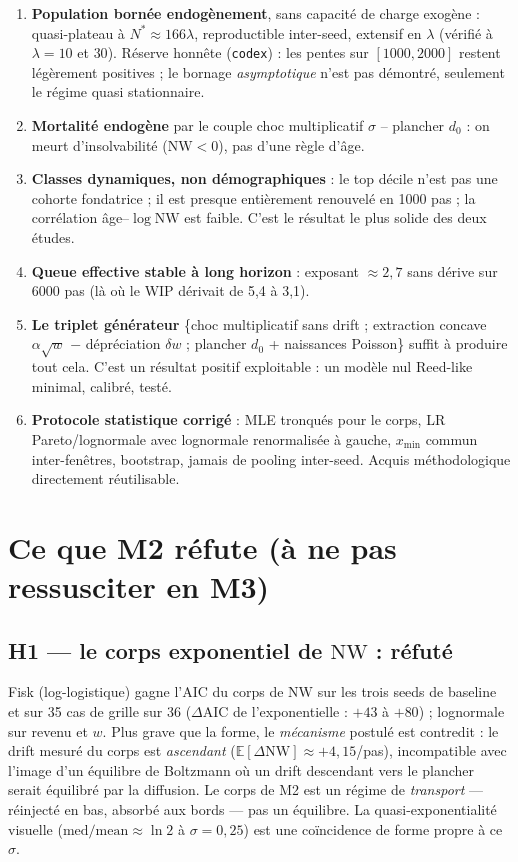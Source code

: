 \documentclass[11pt,a4paper]{article}
\newcommand{\NW}{\mathrm{NW}}
\newcommand{\E}{\mathbb{E}}
\newcommand{\code}[1]{\texttt{#1}}
\begin{document}
\begin{enumerate}[leftmargin=1.6em, itemsep=3pt]
\item \textbf{Population bornée endogènement}, sans capacité de charge exogène :
  quasi-plateau à $N^* \approx 166\lambda$, reproductible inter-seed, extensif en
  $\lambda$ (vérifié à $\lambda = 10$ et $30$). Réserve honnête (\code{codex}) :
  les pentes sur $[1000,2000]$ restent légèrement positives ; le bornage
  \emph{asymptotique} n'est pas démontré, seulement le régime quasi stationnaire.
\item \textbf{Mortalité endogène} par le couple choc multiplicatif $\sigma$ --
  plancher $d_0$ : on meurt d'insolvabilité ($\NW < 0$), pas d'une règle d'âge.
\item \textbf{Classes dynamiques, non démographiques} : le top décile n'est pas
  une cohorte fondatrice ; il est presque entièrement renouvelé en 1000 pas ;
  la corrélation âge--$\log\NW$ est faible. C'est le résultat le plus solide des
  deux études.
\item \textbf{Queue effective stable à long horizon} : exposant $\approx 2{,}7$
  sans dérive sur 6000 pas (là où le WIP dérivait de 5,4 à 3,1).
\item \textbf{Le triplet générateur} \{choc multiplicatif sans drift ;
  extraction concave $\alpha\sqrt{w}$ $-$ dépréciation $\delta w$ ; plancher
  $d_0$ + naissances Poisson\} suffit à produire tout cela. C'est un résultat
  positif exploitable : un modèle nul Reed-like minimal, calibré, testé.
\item \textbf{Protocole statistique corrigé} : MLE tronqués pour le corps,
  LR Pareto/lognormale avec lognormale renormalisée à gauche, $x_{\min}$ commun
  inter-fenêtres, bootstrap, jamais de pooling inter-seed. Acquis méthodologique
  directement réutilisable.
\end{enumerate}

\section{Ce que M2 réfute (à ne pas ressusciter en M3)}

\subsection{H1 --- le corps exponentiel de $\NW$ : réfuté}
Fisk (log-logistique) gagne l'AIC du corps de $\NW$ sur les trois seeds de
baseline et sur 35 cas de grille sur 36 ($\Delta$AIC de l'exponentielle :
$+43$ à $+80$) ; lognormale sur revenu et $w$. Plus grave que la forme, le
\emph{mécanisme} postulé est contredit : le drift mesuré du corps est
\emph{ascendant} ($\E[\Delta\NW] \approx +4{,}15$/pas), incompatible avec
l'image d'un équilibre de Boltzmann où un drift descendant vers le plancher
serait équilibré par la diffusion. Le corps de M2 est un régime de
\emph{transport} --- réinjecté en bas, absorbé aux bords --- pas un équilibre.
La quasi-exponentialité visuelle ($\mathrm{med}/\mathrm{mean} \approx \ln 2$
à $\sigma = 0{,}25$) est une coïncidence de forme propre à ce $\sigma$.
\end{document}

